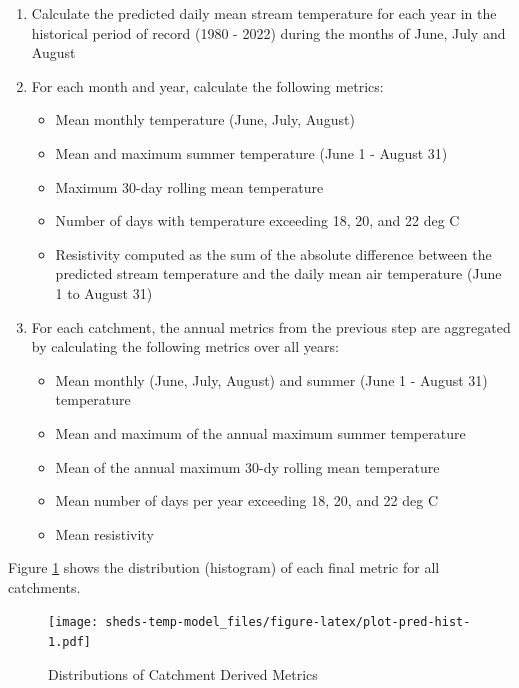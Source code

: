 \documentclass[
]{book}
\providecommand{\tightlist}{%
  \setlength{\itemsep}{0pt}\setlength{\parskip}{0pt}}
\begin{document}
\begin{enumerate}
\def\labelenumi{\arabic{enumi}.}
\tightlist
\item
  Calculate the predicted daily mean stream temperature for each year in the historical period of record (1980 - 2022) during the months of June, July and August
\item
  For each month and year, calculate the following metrics:

  \begin{itemize}
  \tightlist
  \item
    Mean monthly temperature (June, July, August)
  \item
    Mean and maximum summer temperature (June 1 - August 31)
  \item
    Maximum 30-day rolling mean temperature
  \item
    Number of days with temperature exceeding 18, 20, and 22 deg C
  \item
    Resistivity computed as the sum of the absolute difference between the predicted stream temperature and the daily mean air temperature (June 1 to August 31)
  \end{itemize}
\item
  For each catchment, the annual metrics from the previous step are aggregated by calculating the following metrics over all years:

  \begin{itemize}
  \tightlist
  \item
    Mean monthly (June, July, August) and summer (June 1 - August 31) temperature
  \item
    Mean and maximum of the annual maximum summer temperature
  \item
    Mean of the annual maximum 30-dy rolling mean temperature
  \item
    Mean number of days per year exceeding 18, 20, and 22 deg C
  \item
    Mean resistivity
  \end{itemize}
\end{enumerate}

Figure \ref{fig:plot-pred-hist} shows the distribution (histogram) of each final metric for all catchments.

\begin{figure}
\centering
\texttt{[image: sheds-temp-model\_files/figure-latex/plot-pred-hist-1.pdf]}
\caption{\label{fig:plot-pred-hist}Distributions of Catchment Derived Metrics}
\end{figure}
\end{document}
